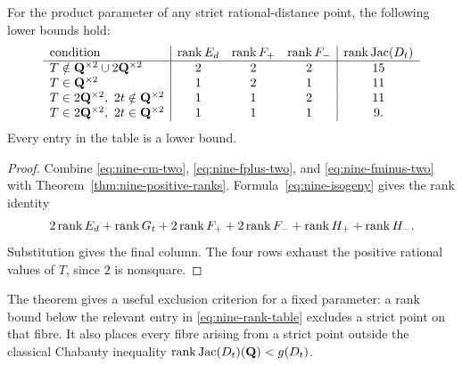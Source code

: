 \begin{theorem}\label{thm:nine-rank-strata}
For the product parameter of any strict rational-distance point, the
following lower bounds hold:
\begin{equation}\label{eq:nine-rank-table}
\begin{array}{l|ccc|c}
 \text{condition}&\operatorname{rank} E_d&\operatorname{rank} F_+&\operatorname{rank} F_-&\operatorname{rank}\operatorname{Jac}(D_t)\\\hline
 T\notin\mathbf Q^{\times2}\cup2\mathbf Q^{\times2}&2&2&2&15\\
 T\in\mathbf Q^{\times2}&1&2&1&11\\
 T\in2\mathbf Q^{\times2},\ 2t\notin\mathbf Q^{\times2}&1&1&2&11\\
 T\in2\mathbf Q^{\times2},\ 2t\in\mathbf Q^{\times2}&1&1&1&9.
\end{array}
\end{equation}
Every entry in the table is a lower bound.
\end{theorem}
\begin{proof}
Combine \eqref{eq:nine-cm-two}, \eqref{eq:nine-fplus-two}, and
\eqref{eq:nine-fminus-two} with
Theorem~\ref{thm:nine-positive-ranks}.  Formula~\eqref{eq:nine-isogeny}
gives the rank identity
\[
 2\operatorname{rank} E_d+\operatorname{rank} G_t+2\operatorname{rank} F_++2\operatorname{rank} F_-+
 \operatorname{rank} H_++\operatorname{rank} H_-.
\]
Substitution gives the final column.  The four rows exhaust the
positive rational values of $T$, since $2$ is nonsquare.
\end{proof}

The theorem gives a useful exclusion criterion for a fixed parameter:
a rank bound below the relevant entry in
\eqref{eq:nine-rank-table} excludes a strict point on that fibre.
It also places every fibre arising from a strict point outside the
classical Chabauty inequality $\operatorname{rank}\operatorname{Jac}(D_t)(\mathbf Q)<g(D_t)$.
